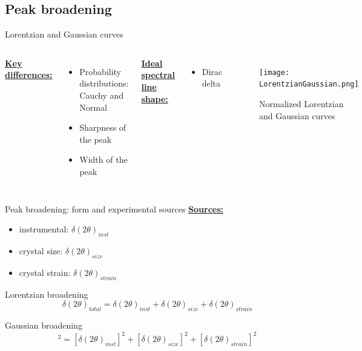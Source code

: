 \documentclass{beamer}
\begin{document}
\subsection{Peak broadening}

\begin{frame}{Lorentzian and Gaussian curves}
    \begin{columns}
        \textbf{\underline{Key differences:}}
        \begin{itemize}
            \item Probability distributions: Cauchy and Normal
            \item Sharpness of the peak
            \item Width of the peak
        \end{itemize}
        \textbf{\underline{Ideal spectral line shape:}}
        \begin{itemize}
            \item Dirac delta
        \end{itemize}
        \begin{figure}
            \centering
            \texttt{[image: LorentzianGaussian.png]}
            \caption{Normalized Lorentzian and Gaussian curves}
            \label{fig:GaussianLorentzian}
        \end{figure}
    \end{columns}
\end{frame}

\begin{frame}{Peak broadening: form and experimental sources}
    \textbf{\underline{Sources:}}
    \begin{itemize}
        \item instrumental: $\delta (2 \theta)_{inst}$
        \item crystal size: $\delta (2 \theta)_{size}$
        \item crystal strain: $\delta (2 \theta)_{strain}$
    \end{itemize}   
    \begin{block}{Lorentzian broadening}
        \begin{equation*}
            \delta(2\theta)_{total} = \delta(2\theta)_{inst} + \delta(2\theta)_{size} + \delta(2\theta)_{strain} 
        \end{equation*}
    \end{block}
    \begin{block}{Gaussian broadening}
        \begin{equation*}
            [\delta(2\theta)_{total}]^2 = [\delta(2\theta)_{inst}]^2 + [\delta(2\theta)_{size}]^2 + [\delta(2\theta)_{strain}]^2 
        \end{equation*}
    \end{block}   
\end{frame}
\end{document}
